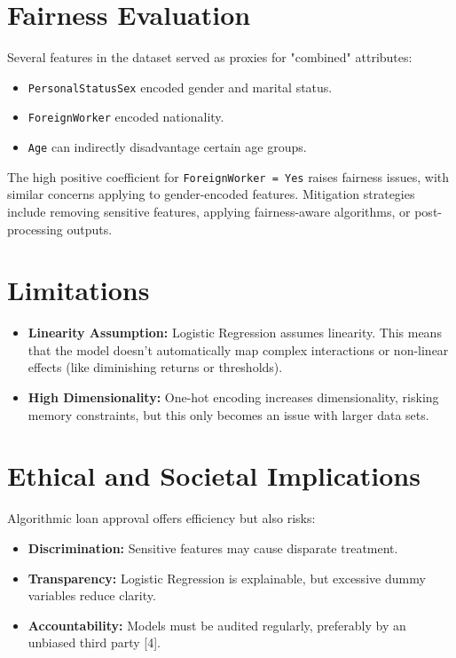 \documentclass[12pt]{article}
\begin{document}
	\section{Fairness Evaluation}
	Several features in the dataset served as proxies for "combined" attributes:
	\begin{itemize}
		\item \texttt{PersonalStatusSex} encoded gender and marital status.
		\item \texttt{ForeignWorker} encoded nationality.
		\item \texttt{Age} can indirectly disadvantage certain age groups.
	\end{itemize}
	
	The high positive coefficient for \texttt{ForeignWorker = Yes} raises fairness issues, with similar concerns applying to gender-encoded features. Mitigation strategies include removing sensitive features, applying fairness-aware algorithms, or post-processing outputs.
	
	\section{Limitations}
	\begin{itemize}
		\item \textbf{Linearity Assumption:} Logistic Regression assumes linearity. This means that the model doesn't automatically map complex interactions or non-linear effects (like diminishing returns or thresholds).
		\item \textbf{High Dimensionality:} One-hot encoding increases dimensionality, risking memory constraints, but this only becomes an issue with larger data sets.
	\end{itemize}
	
	\section{Ethical and Societal Implications}
	Algorithmic loan approval offers efficiency but also risks:
	\begin{itemize}
		\item \textbf{Discrimination:} Sensitive features may cause disparate treatment.
		\item \textbf{Transparency:} Logistic Regression is explainable, but excessive dummy variables reduce clarity.
		\item \textbf{Accountability:} Models must be audited regularly, preferably by an unbiased third party [4].
	\end{itemize}
	
\end{document}
